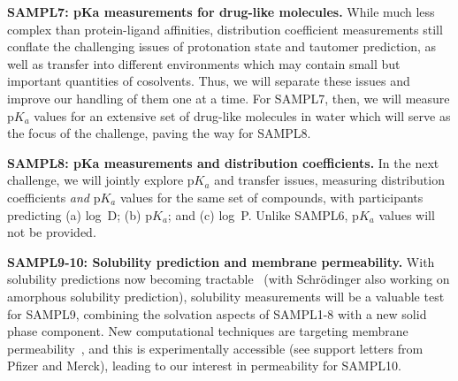 \documentclass[11pt]{article}
\begin{document}
\textbf{SAMPL7: pKa measurements for drug-like molecules.} 
While much less complex than protein-ligand affinities, distribution coefficient measurements still conflate the challenging issues of protonation state and tautomer prediction, as well as transfer into different environments which may contain small but important quantities of cosolvents. 
Thus, we will separate these issues and improve our handling of them one at a time. 
For SAMPL7, then, we will measure p$K_a$ values for an extensive set of drug-like molecules in water which will serve as the focus of the challenge, paving the way for SAMPL8.

\textbf{SAMPL8: pKa measurements and distribution coefficients.}
In the next challenge, we will jointly explore p$K_a$ and transfer issues, measuring distribution coefficients \emph{and} p$K_a$ values for the same set of compounds, with participants predicting (a) log~D; (b) p$K_a$; and (c) log~P. 
Unlike SAMPL6, p$K_a$ values will not be provided.

\textbf{SAMPL9-10: Solubility prediction and membrane permeability.}
With solubility predictions now becoming tractable~\cite{Schnieders:2012:J.Chem.TheoryComput., park_absolute_2014, liu_using_2016} (with Schr\"{o}dinger also working on amorphous solubility prediction), solubility measurements will be a valuable test for SAMPL9, combining the solvation aspects of SAMPL1-8 with a new solid phase component.
New computational techniques are targeting membrane permeability~\cite{lee_permeability_2016, comer_permeability_2014}, and this is experimentally accessible (see support letters from Pfizer and Merck), leading to our interest in permeability for SAMPL10.
  
\end{document}
